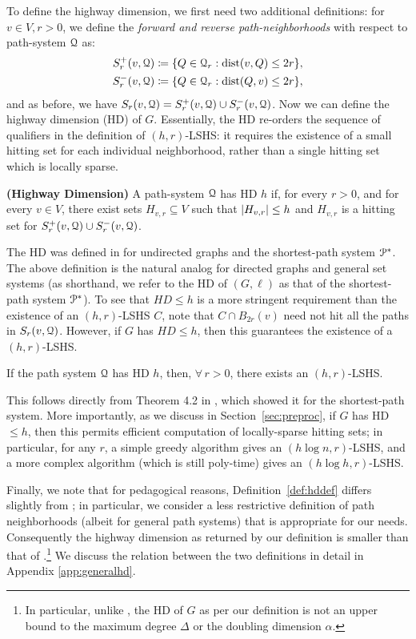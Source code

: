 To define the highway dimension, we first need two additional definitions:
for $v\in V, r>0$, we define the \emph{forward and reverse path-neighborhoods} with respect to path-system $\mathcal{Q}$ as: 
\begin{align*}
S_r^+(v,\calQ) &\defeq\crl*{Q\in\calQ_r: \dist(v,Q)\leq 2r}, \\  
S_r^-(v,\calQ) &\defeq\crl*{Q\in\calQ_r: \dist(Q,v)\leq 2r},
\end{align*}
and as before, we have $S_r(v,\mathcal{Q}) = S_r^+(v,\mathcal{Q})\cup S_r^-(v,\mathcal{Q})$. Now we can define the highway dimension (HD) of $G$. Essentially, the HD re-orders the sequence of qualifiers in the definition of $(h,r)$-LSHS: it requires the existence of a small hitting set for each individual neighborhood, rather than a single hitting set which is locally sparse. 
\begin{definition}
\label{def:hddef}
\textbf{(Highway Dimension)}
A path-system $\mathcal{Q}$ has HD $h$ if, for every $r>0$, and for every $v\in V$, there exist sets $H_{v,r}\subseteq V$ such that $\lvert H_{v,r}\rvert\leq h$ and $H_{v,r}$ is a hitting set for $S_r^+(v,\mathcal{Q})\cup S_r^-(v,\mathcal{Q})$.
\end{definition}
The HD was defined in \cite{highway2013} for undirected graphs and the shortest-path system $\mathcal{P}^*$. 
The above definition is the natural analog for directed graphs and general set systems (as shorthand, we refer to the HD of $(G,\ell)$ as that of the shortest-path system $\mathcal{P}^*$). 
To see that $HD\leq h$ is a more stringent requirement than the existence of an $(h,r)$-LSHS $C$, note that $C\cap B_{2r}(v)$ need not hit all the paths in $S_r(v,\mathcal{Q})$. 
However, if $G$ has $HD\leq h$, then this guarantees the existence of a $(h,r)$-LSHS.
\begin{proposition}
If the path system $\mathcal{Q}$ has HD $h$, then, $\forall\,r>0$, there exists an $(h,r)$-LSHS.
\end{proposition}
This follows directly from Theorem 4.2 in \cite{highway2013}, which showed it for the shortest-path system. More importantly, as we discuss in Section~\ref{sec:preproc}, if $G$ has HD$\leq h$, then this permits efficient computation of locally-sparse hitting sets; in particular, for any $r$, a simple greedy algorithm gives an $(h\log n,r)$-LSHS, and a more complex algorithm (which is still poly-time) gives an $(h\log h,r)$-LSHS.


Finally, we note that for pedagogical reasons, Definition~\ref{def:hddef} differs slightly from \cite{highway2013}; in particular, we consider a less restrictive definition of path neighborhoods (albeit for general path systems) that is appropriate for our needs. Consequently the highway dimension as returned by our definition is smaller than that of \cite{highway2013}.\footnote{In particular, unlike \cite{highway2013}, the HD of $G$ as per our definition is not an upper bound to the maximum degree $\Delta$ or the doubling dimension $\alpha$.}
We discuss the relation between the two definitions in detail in Appendix \ref{app:generalhd}. 

